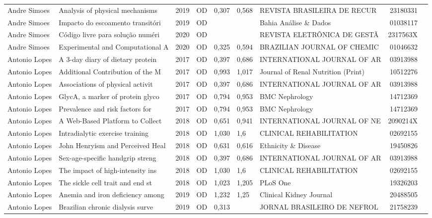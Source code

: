 \documentclass[12pt,brazil]{article}\usepackage[]{graphicx}\usepackage[]{xcolor}
\begin{document}
\begin{longtable}{lllrrllrr}
Andre Simoes & Analysis of physical mechanisms  & 2019 & OD & 0,307 & 0,568 & REVISTA BRASILEIRA DE RECUR & 23180331 \\
Andre Simoes & Impacto do escoamento transitóri & 2019 & OD &  &  & Bahia Análise \& Dados & 01038117 \\
Andre Simoes & Código livre para solução numéri & 2020 & OD &  &  & REVISTA ELETRÔNICA DE GESTÃ & 2317563X \\
Andre Simoes & Experimental and Computational A & 2020 & OD & 0,325 & 0,594 & BRAZILIAN JOURNAL OF CHEMIC & 01046632 \\
Antonio Lopes & A 3-day diary of dietary protein & 2017 & OD & 0,397 & 0,686 & INTERNATIONAL JOURNAL OF AR & 03913988 \\
Antonio Lopes & Additional Contribution of the M & 2017 & OD & 0,993 & 1,017 & Journal of Renal Nutrition (Print) & 10512276 \\
Antonio Lopes & Associations of physical activit & 2017 & OD & 0,397 & 0,686 & INTERNATIONAL JOURNAL OF AR & 03913988 \\
Antonio Lopes & GlycA, a marker of protein glyco & 2017 & OD & 0,794 & 0,953 & BMC Nephrology & 14712369 \\
Antonio Lopes & Prevalence and risk factors for  & 2017 & OD & 0,794 & 0,953 & BMC Nephrology & 14712369 \\
Antonio Lopes & A Web-Based Platform to Collect  & 2018 & OD & 0,651 & 0,941 & INTERNATIONAL JOURNAL OF NE & 2090214X \\
Antonio Lopes & Intradialytic exercise training  & 2018 & OD & 1,030 & 1,6 & CLINICAL REHABILITATION & 02692155 \\
Antonio Lopes & John Henryism and Perceived Heal & 2018 & OD & 0,631 & 0,616 & Ethnicity \& Disease & 19450826 \\
Antonio Lopes & Sex-age-specific handgrip streng & 2018 & OD & 0,397 & 0,686 & INTERNATIONAL JOURNAL OF AR & 03913988 \\
Antonio Lopes & The impact of high-intensity ins & 2018 & OD & 1,030 & 1,6 & CLINICAL REHABILITATION & 02692155 \\
Antonio Lopes & The sickle cell trait and end st & 2018 & OD & 1,023 & 1,205 & PLoS One & 19326203 \\
Antonio Lopes & Anemia and iron deficiency among & 2019 & OD & 1,232 & 1,25 & Clinical Kidney Journal & 20488505 \\
Antonio Lopes & Brazilian chronic dialysis surve & 2019 & OD & 0,313 &  & JORNAL BRASILEIRO DE NEFROL & 21758239 \\

\end{longtable}
\end{document}
